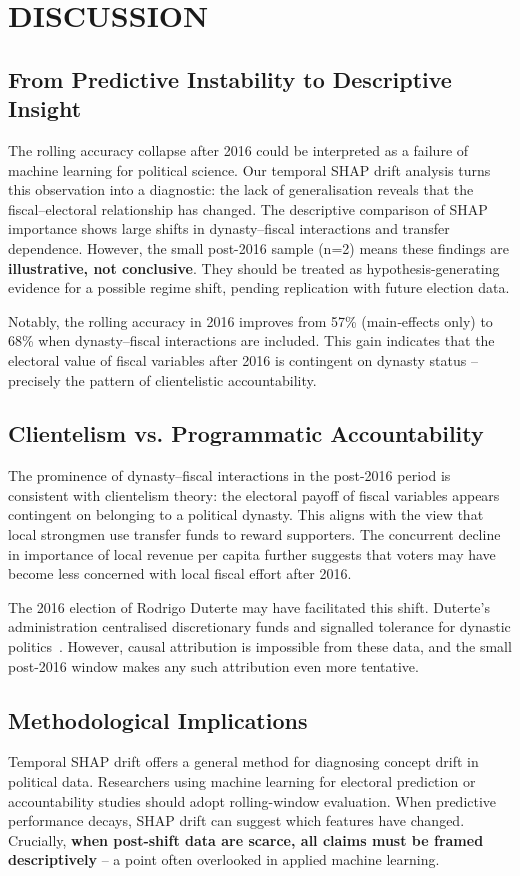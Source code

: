 \documentclass[conference]{IEEEtran}
\begin{document}
\section{DISCUSSION}

\subsection{From Predictive Instability to Descriptive Insight}
The rolling accuracy collapse after 2016 could be interpreted as a failure of machine learning for political science. Our temporal SHAP drift analysis turns this observation into a diagnostic: the lack of generalisation reveals that the fiscal–electoral relationship has changed. The descriptive comparison of SHAP importance shows large shifts in dynasty–fiscal interactions and transfer dependence. However, the small post-2016 sample (n=2) means these findings are \textbf{illustrative, not conclusive}. They should be treated as hypothesis-generating evidence for a possible regime shift, pending replication with future election data.

Notably, the rolling accuracy in 2016 improves from 57\% (main‑effects only) to 68\% when dynasty–fiscal interactions are included. This gain indicates that the electoral value of fiscal variables after 2016 is contingent on dynasty status – precisely the pattern of clientelistic accountability.

\subsection{Clientelism vs. Programmatic Accountability}
The prominence of dynasty–fiscal interactions in the post-2016 period is consistent with clientelism theory: the electoral payoff of fiscal variables appears contingent on belonging to a political dynasty. This aligns with the view that local strongmen use transfer funds to reward supporters. The concurrent decline in importance of local revenue per capita further suggests that voters may have become less concerned with local fiscal effort after 2016.

The 2016 election of Rodrigo Duterte may have facilitated this shift. Duterte's administration centralised discretionary funds and signalled tolerance for dynastic politics~\cite{curato2016, pcj2025}. However, causal attribution is impossible from these data, and the small post-2016 window makes any such attribution even more tentative.

\subsection{Methodological Implications}
Temporal SHAP drift offers a general method for diagnosing concept drift in political data. Researchers using machine learning for electoral prediction or accountability studies should adopt rolling-window evaluation. When predictive performance decays, SHAP drift can suggest which features have changed. Crucially, \textbf{when post-shift data are scarce, all claims must be framed descriptively} – a point often overlooked in applied machine learning.
\end{document}
